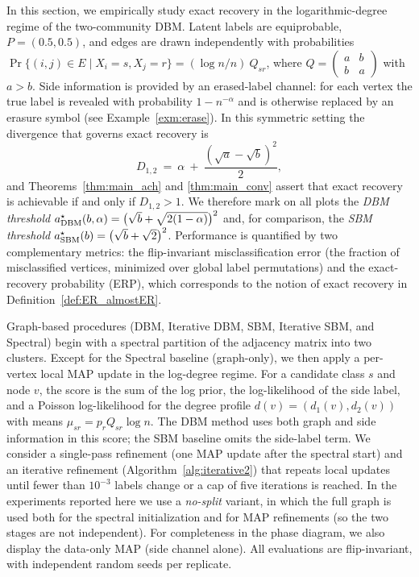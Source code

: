 \documentclass[11pt]{article}
\theoremstyle{plain}
\theoremstyle{definition}
\begin{document}
In this section, we empirically study exact recovery in the logarithmic-degree regime of the two-community DBM. Latent labels are equiprobable, $P=(0.5,0.5)$, and edges are drawn independently with probabilities $\Pr\{(i,j)\in E \mid X_i=s,X_j=r\}=(\log n/n)\ Q_{sr}$, where $Q=\begin{pmatrix}a&b\\ b&a\end{pmatrix}$ with $a>b$. Side information is provided by an erased-label channel: for each vertex the true label is revealed with probability $1-n^{-\alpha}$ and is otherwise replaced by an erasure symbol (see Example~\ref{exm:erase}). In this symmetric setting the divergence that governs exact recovery is
\[
D_{1,2} \ =\  \alpha \ +\  \frac{(\sqrt a-\sqrt b)^2}{2},
\]
and Theorems~\ref{thm:main_ach} and \ref{thm:main_conv} assert that exact recovery is achievable if and only if $D_{1,2}>1$. We therefore mark on all plots the \emph{DBM threshold} $a^\star_{\rm DBM}(b,\alpha)=\big(\sqrt b+\sqrt{2(1-\alpha)}\big)^2$ and, for comparison, the \emph{SBM threshold} $a^\star_{\rm SBM}(b)=\big(\sqrt b+\sqrt2\big)^2$. 
Performance is quantified by two complementary metrics: the flip-invariant misclassification error (the fraction of misclassified vertices, minimized over global label permutations) and the exact-recovery probability (ERP), which corresponds to the notion of exact recovery in Definition~\ref{def:ER_almostER}.


Graph-based procedures (DBM, Iterative DBM, SBM, Iterative SBM, and Spectral) begin with a spectral partition of the adjacency matrix into two clusters. Except for the Spectral baseline (graph-only), we then apply a per-vertex local MAP update in the log-degree regime. For a candidate class $s$ and node $v$, the score is the sum of the log prior, the log-likelihood of the side label, and a Poisson log-likelihood for the degree profile $d(v)=(d_1(v),d_2(v))$ with means $\mu_{sr}=p_r Q_{sr}\log n$. The DBM method uses both graph and side information in this score; the SBM baseline omits the side-label term. We consider a single-pass refinement (one MAP update after the spectral start) and an iterative refinement (Algorithm~\ref{alg:iterative2}) that repeats local updates until fewer than $10^{-3}$ labels change or a cap of five iterations is reached. In the experiments reported here we use a \emph{no-split} variant, in which the full graph is used both for the spectral initialization and for MAP refinements (so the two stages are not independent). For completeness in the phase diagram, we also display the data-only MAP (side channel alone). All evaluations are flip-invariant, with independent random seeds per replicate.
\end{document}
